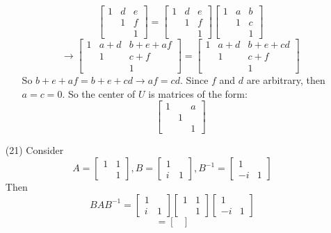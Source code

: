 \documentclass[12pt]{article}
\begin{document}
\begin{itemize}
\begin{itemize}
$$\begin{bmatrix}
1 & d & e \\
& 1 & f \\
& & 1
\end{bmatrix} = \begin{bmatrix}
1 & d & e \\
& 1 & f \\
& & 1
\end{bmatrix}\begin{bmatrix}
1 & a & b \\
& 1 & c \\
& & 1
\end{bmatrix}$$
$$\rightarrow \begin{bmatrix}
1 & a + d & b + e + af \\
& 1 & c + f \\
& & 1
\end{bmatrix} = \begin{bmatrix}
1 & a + d & b + e + cd \\
& 1 & c + f \\
& & 1
\end{bmatrix}$$
So $b + e + af = b + e + cd \rightarrow af = cd$. Since $f$ and $d$ are arbitrary, then $a = c = 0$. So the center of $U$ is matrices of the form:
$$\begin{bmatrix}
1 & & a \\
& 1 \\
& & 1
\end{bmatrix}$$
\end{itemize}
\item[(21)]
Consider 
$$A = \begin{bmatrix}
1 & 1 \\
& 1
\end{bmatrix}, B = \begin{bmatrix}
1 \\
i & 1
\end{bmatrix}, B^{-1} = \begin{bmatrix}
1 \\
-i & 1
\end{bmatrix}$$
Then
$$BAB^{-1} = \begin{bmatrix}
1 \\
i & 1
\end{bmatrix}\begin{bmatrix}
1 & 1 \\
& 1
\end{bmatrix}\begin{bmatrix}
1 & \\
-i & 1
\end{bmatrix}$$
$$= \begin{bmatrix}

\end{bmatrix}$$
\end{itemize}
\end{document}
